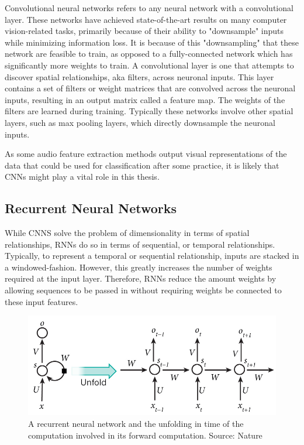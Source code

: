 Convolutional neural networks refers to any neural network with a convolutional layer.  These networks have achieved state-of-the-art results on many computer vision-related tasks, primarily because of their ability to "downsample" inputs while minimizing information loss.  It is because of this "downsampling" that these network are feasible to train, as opposed to a fully-connected network which has significantly more weights to train.  A convolutional layer is one that attempts to discover spatial relationships, aka filters, across neuronal inputs.
This layer contains a set of filters or weight matrices that are convolved across the neuronal inputs, resulting in an output matrix called a feature map.  The weights of the filters are learned during training.  Typically these networks involve other spatial layers, such as max pooling layers, which directly downsample the neuronal inputs.

As some audio feature extraction methods output visual representations of the data that could be used for classification after some practice, it is likely that CNNs might play a vital role in this thesis. 

\subsection{Recurrent Neural Networks}

While CNNS solve the problem of dimensionality in terms of spatial relationships, RNNs do so in terms of sequential, or temporal relationships.  Typically, to represent a temporal or sequential relationship, inputs are stacked in a windowed-fashion.  However, this greatly increases the number of weights required at the input layer.  Therefore, RNNs reduce the amount weights by allowing sequences to be passed in without requiring weights be connected to these input features.




\begin{figure}[h]
    \centering
	\includegraphics[width=.8\textwidth]{./images/illustrations/rnn}
    \caption{A recurrent neural network and the unfolding in time of the computation involved in its forward computation. Source: Nature}
    \label{fig:rnn}
\end{figure}



